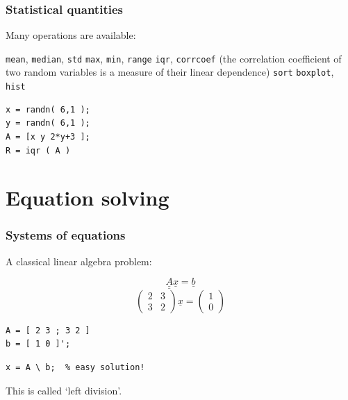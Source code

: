 \documentclass[11pt]{beamer}
\begin{document}
\begin{frame}[fragile]
  \frametitle{Statistical quantities}
  \Enlarge

  \begin{enumerate}
  \myitem  Many operations are available:
    \begin{enumerate}
    \mysubitem  \texttt{mean}, \texttt{median}, \texttt{std}
    \mysubitem  \texttt{max}, \texttt{min}, \texttt{range}
    \mysubitem  \texttt{iqr}, \texttt{corrcoef} (the correlation coefficient of two random variables is a measure of their linear dependence)
    \mysubitem  \texttt{sort}
    \mysubitem  \texttt{boxplot}, \texttt{hist}
    \end{enumerate}
  \end{enumerate}
  \begin{Verbatim}
x = randn( 6,1 );
y = randn( 6,1 );
A = [x y 2*y+3 ];
R = iqr ( A )
  \end{Verbatim}
\end{frame}


\section{Equation solving}

\begin{frame}[fragile]
  \frametitle{Systems of equations}
  \Enlarge

  \begin{enumerate}
  \myitem  A classical linear algebra problem:
  \end{enumerate}
  $$
\underline{\underline{A}} \underline{x} = \underline{b}
  $$
  $$
\left( \begin{array}{cc}
  2 & 3 \\
  3 & 2
\end{array} \right)
\underline{x}
=
\left( \begin{array}{c}
  1 \\
  0
\end{array} \right)
  $$
  \begin{Verbatim}
A = [ 2 3 ; 3 2 ]
b = [ 1 0 ]';
  \end{Verbatim}
  \begin{Verbatim}
x = A \ b;  % easy solution!
  \end{Verbatim}
  \begin{enumerate}
  \myitem  This is called `left division'.
  \end{enumerate}
\end{frame}
\end{document}

